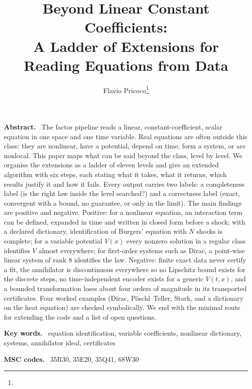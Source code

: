 \documentclass[11pt]{article}
\title{Beyond Linear Constant Coefficients:\\A Ladder of Extensions for Reading Equations from Data}
\author{Flavio Pricoco\thanks{\email{flaflapr@gmail.com}}}
\newenvironment{keywords}{\par\smallskip\noindent\textbf{Key words.}\ }{\par}
\newenvironment{MSCcodes}{\par\smallskip\noindent\textbf{MSC codes.}\ }{\par}
\renewenvironment{abstract}{\par\small\noindent\textbf{Abstract.}\ }{\par\normalsize}
\theoremstyle{plain}
\theoremstyle{definition}
\theoremstyle{remark}
\begin{document}
\maketitle

\begin{abstract}
The factor pipeline reads a linear, constant-coefficient, scalar equation in one space and one time variable. Real equations are
often outside this class: they are nonlinear, have a potential, depend on time, form a system, or are nonlocal. This paper maps what
can be said beyond the class, level by level. We organise the extensions as a ladder of eleven levels and give an extended algorithm with
six steps, each stating what it takes, what it returns, which results justify it and how it fails. Every output carries two labels: a
completeness label (is the right law inside the level searched?) and a correctness label (exact, convergent with a bound, no guarantee, or
only in the limit). The main findings are positive and negative. Positive: for a nonlinear equation, an interaction term can be defined, expanded
in time and written in closed form before a shock; with a declared dictionary, identification of Burgers' equation with $N$ shocks is
complete; for a variable potential $V(x)$ every nonzero solution in a regular class identifies $V$ almost everywhere; for first-order
systems such as Dirac, a point-wise linear system of rank $8$ identifies the law. Negative: finite exact data never certify a fit, the
annihilator is discontinuous everywhere so no Lipschitz bound exists for the discrete steps, no time-independent encoder exists for a generic
$V(t,x)$, and a bounded transformation loses about four orders of magnitude in its transported certificates. Four worked examples (Dirac,
P\"oschl--Teller, Stark, and a dictionary on the heat equation) are checked symbolically. We end with the minimal route for extending the code
and a list of open questions.
\end{abstract}

\begin{keywords}
equation identification, variable coefficients, nonlinear dictionary, systems, annihilator ideal, certificates
\end{keywords}

\begin{MSCcodes}
35R30, 35E20, 35Q41, 68W30
\end{MSCcodes}
\end{document}
